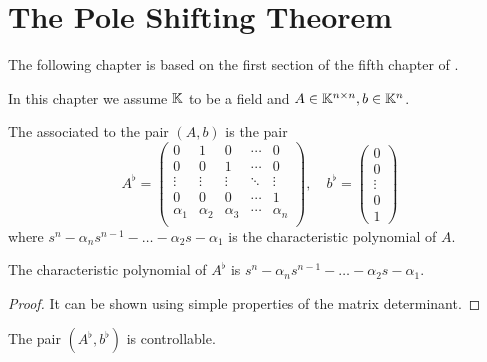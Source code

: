 \chapter{The Pole Shifting Theorem}

The following chapter is based on the first section of the fifth chapter of \citet{Sontag1998}.

\begin{remark}
    In this chapter we assume $\mathbb{K}$ to be a field and $A\in\mathbb{K}^{n\times n}, b\in\mathbb{K}^n$.
\end{remark}

\begin{definition}
    The  associated to the pair $(A,b)$ is the pair 
    \begin{equation*}
        A^\flat=
        \begin{pmatrix}
            0 & 1 & 0 & \cdots & 0 \\
            0 & 0 & 1 & \cdots & 0 \\
            \vdots & \vdots & \vdots & \ddots & \vdots \\
            0 & 0 & 0 & \cdots & 1 \\
            \alpha_1 & \alpha_2 & \alpha_3 & \cdots & \alpha_n \\
        \end{pmatrix},
        \quad
        b^\flat=
        \begin{pmatrix}
            0 \\
            0 \\
            \vdots \\
            0 \\
            1
        \end{pmatrix}
    \end{equation*}
    where $s^n-\alpha_ns^{n-1}-\ldots-\alpha_2s-\alpha_1$ is the characteristic polynomial of $A$.
\end{definition}

\begin{lemma}
\label{lem:flatCharPol}
    The characteristic polynomial of $A^\flat$ is $s^n-\alpha_ns^{n-1}-\ldots-\alpha_2s-\alpha_1$.
\end{lemma}

\begin{proof}
    It can be shown using simple properties of the matrix determinant.
\end{proof}

\begin{lemma}
\label{lem:flatControllable}
    The pair $(A^\flat,b^\flat)$ is controllable.
\end{lemma}

